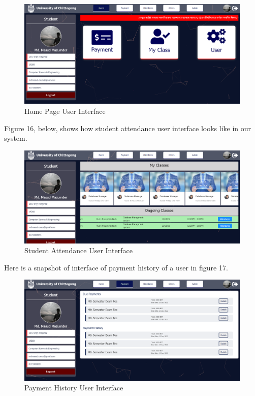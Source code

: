 \begin{figure}[H]
	\includegraphics[width=1\textwidth]{images/home}
	\caption{Home Page User Interface}
\end{figure}
Figure 16, below, shows how student attendance user interface looks like in our system.\\
\begin{figure}[H]
	\includegraphics[width=1\textwidth]{images/stu_att}
	\caption{Student Attendance User Interface}
\end{figure}
Here is a snapshot of interface of payment history of a user in figure 17.\\
\begin{figure}[H]
	\includegraphics[width=1\textwidth]{images/payhistory}
	\caption{Payment History User Interface}
\end{figure}

